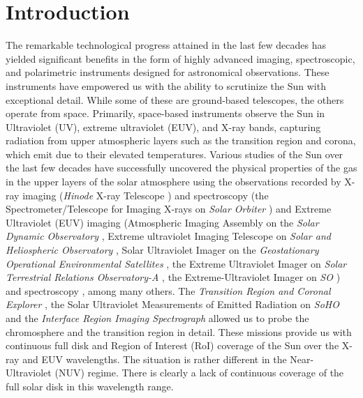 \justifying

\section{Introduction} \label{sec:intro}

The remarkable technological progress attained in the last few decades has yielded significant benefits in the form of highly advanced imaging, spectroscopic, and polarimetric instruments designed for astronomical observations. These instruments have empowered us with the ability to scrutinize the Sun with exceptional detail. While some of these are ground-based telescopes, the others operate from space. Primarily, space-based instruments observe the Sun in Ultraviolet (UV), extreme ultraviolet (EUV), and X-ray bands, capturing radiation from upper atmospheric layers such as the transition region and corona, which emit due to their elevated temperatures. Various studies of the Sun over the last few decades have successfully uncovered the physical properties of the gas in the upper layers of the solar atmosphere using the observations recorded by X-ray imaging ({\it Hinode} X-ray Telescope \citep[{\it Hindoe}/XRT,][]{xrt}) and spectroscopy (the Spectrometer/Telescope for Imaging X-rays on {\it Solar Orbiter} \citep[{\it SO}/STIX,][]{stix}) and Extreme Ultraviolet (EUV) imaging (Atmospheric Imaging Assembly on the {\it Solar Dynamic Observatory} \cite[{\it SDO}/AIA,][]{aia}, Extreme ultraviolet Imaging Telescope on {\it Solar and Heliospheric Observatory} \cite[{\it SoHO}/EIT,][]{eit}, Solar Ultraviolet Imager on the {\it Geostationary Operational Environmental Satellites} \citep[{\it GOES}/SUVI,][]{suvi}, the Extreme Ultraviolet Imager on {\it Solar Terrestrial Relations Observatory-A} \cite[{\it STEREO-A}/EUVI,][]{stereo,euvi}, the Extreme-Ultraviolet Imager on {\it SO} \citep[{\it SO}/EUI][]{eui}) and spectroscopy \citep[Hinode/EIS,][]{eis}, among many others. The {\it Transition Region and Coronal Explorer} \citep[{\it TRACE},][]{trace}, the Solar Ultraviolet Measurements of Emitted Radiation on {\it SoHO} \citep[{\it SoHO}/SUMER,][]{sumer} and the {\it Interface Region Imaging Spectrograph} \citep[~{\it IRIS},][]{iris} allowed us to probe the chromosphere and the transition region in detail. These missions provide us with continuous full disk and Region of Interest (RoI) coverage of the Sun over the X-ray and EUV wavelengths. The situation is rather different in the Near-Ultraviolet (NUV) regime. There is clearly a lack of continuous coverage of the full solar disk in this wavelength range. 


